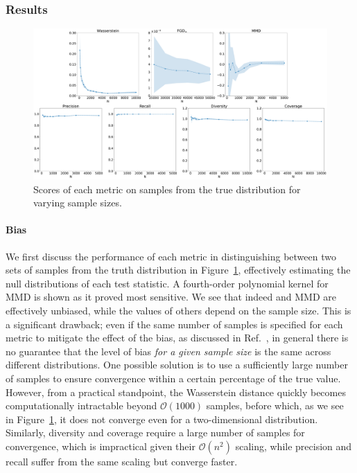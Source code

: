 \subsubsection{Results}
\label{sec:04_evaluating_toydata_results}

\begin{figure}[ht]
    \includegraphics[width=\textwidth]{figures/04-ML4Sim/evaluating/truth_scores.pdf}
    \caption{Scores of each metric on samples from the true distribution for varying sample sizes.}
    \label{fig:04_evaluating_toy_truth_scores}
\end{figure}

\paragraph{Bias}

We first discuss the performance of each metric in distinguishing between two sets of samples from the truth distribution in Figure~\ref{fig:04_evaluating_toy_truth_scores}, effectively estimating the null distributions of each test statistic.
A fourth-order polynomial kernel for MMD is shown as it proved most sensitive.
We see that indeed \fgdinf and MMD are effectively unbiased, while the values of others depend on the sample size. 
This is a significant drawback; even if the same number of samples is specified for each metric to mitigate the effect of the bias, as discussed in Ref.~\cite{chong_unbiasedfid}, in general there is no guarantee that the level of bias \textit{for a given sample size} is the same across different distributions.
One possible solution is to use a sufficiently large number of samples to ensure convergence within a certain percentage of the true value. 
However, from a practical standpoint, the Wasserstein distance quickly becomes computationally intractable beyond $\mathcal{O}(1000)$ samples, before which, as we see in Figure~\ref{fig:04_evaluating_toy_truth_scores}, it does not converge even for a two-dimensional distribution.
Similarly, diversity and coverage require a large number of samples for convergence, which is impractical given their $\mathcal{O}(n^2)$ scaling, while precision and recall suffer from the same scaling but converge faster.


